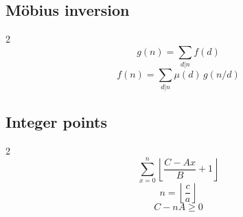 \subsection{Möbius inversion}
\begin{multicols}{2}
\[
g(n)=\sum_{d|n} f(d)
\]
\[
f(n)=\sum_{d|n}\mu(d)\,g(n/d)
\]
\end{multicols}

\subsection{Integer points}
\begin{multicols}{2}
\[
\sum_{x=0}^n \left\lfloor \frac{C-Ax}{B}+1 \right\rfloor
\]
\[
n=\left\lfloor \frac{c}{a}\right\rfloor
\]
\[
C-nA\ge 0
\]
\end{multicols}